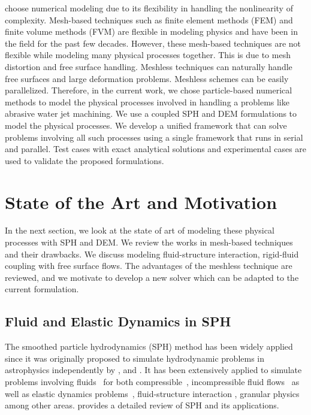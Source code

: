 choose numerical modeling due to its flexibility in handling the nonlinearity of
complexity. Mesh-based techniques such as finite element methods (FEM) and
finite volume methods (FVM) are flexible in modeling physics and have been in
the field for the past few decades. However, these mesh-based techniques are not
flexible while modeling many physical processes together. This is due to mesh
distortion and free surface handling. Meshless techniques can naturally handle
free surfaces and large deformation problems. Meshless schemes can be easily
parallelized. Therefore, in the current work, we chose particle-based numerical
methods to model the physical processes involved in handling a problems like
abrasive water jet machining. We use a coupled SPH and DEM formulations to
model the physical processes. We develop a unified framework that can solve
problems involving all such processes using a single framework that runs in
serial and parallel. Test cases with exact analytical solutions and experimental
cases are used to validate the proposed formulations.




\section{State of the Art and Motivation}
In the next section, we look at the state of art of modeling these physical
processes with SPH and DEM. We review the works in mesh-based techniques and
their drawbacks. We discuss modeling fluid-structure interaction, rigid-fluid
coupling with free surface flows. The advantages of the meshless technique are
reviewed, and we motivate to develop a new solver which can be adapted to the
current formulation.


\subsection{Fluid and Elastic Dynamics in SPH}
The smoothed particle hydrodynamics (SPH) method has been widely applied since
it was originally proposed to simulate hydrodynamic problems in astrophysics
independently by \textcite{lucy77}, and \textcite{monaghan-gingold-stars-mnras-77}. It
has been extensively applied to simulate problems involving
fluids~\parencite{dalrymple2001sph,shao2003incompressible} for both
compressible~\parencite{monaghan-review:2005}, incompressible fluid
flows~\parencite{sph:fsf:monaghan-jcp94,sph:psph:cummins-rudman:jcp:1999} as well as
elastic dynamics problems~\parencite{randles-1996,gray-ed-2001}, fluid-structure
interaction \parencite{khayyer2018enhanced,he2017coupled}, granular physics
\parencite{bui2008lagrangian,bui2021smoothed} among other areas.
\textcite{monaghan2012smoothed} provides a detailed review of SPH and its
applications.

